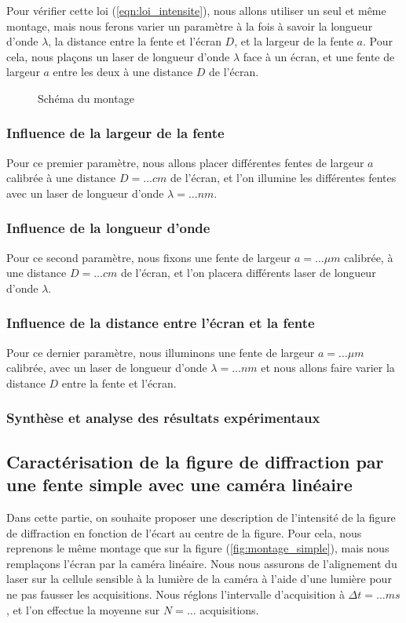 \documentclass[12pt]{article}
\begin{document}
Pour vérifier cette loi (\ref{eqn:loi_intensite}), nous allons utiliser un seul et même montage, mais nous ferons varier un paramètre à la fois à savoir la longueur d'onde $\lambda$, la distance entre la fente et l'écran $D$, 
et la largeur de la fente $a$. Pour cela, nous plaçons un laser de longueur d'onde $\lambda$ face à un écran, et une fente de largeur $a$ entre les deux à une distance $D$ de l'écran.

\begin{figure}[!h]
    \begin{center}
        \resizebox{0.7\textwidth}{5cm}{
        
        }
    \end{center}
    \caption{Schéma du montage}
\end{figure}

\subsubsection{Influence de la largeur de la fente}
Pour ce premier paramètre, nous allons placer différentes fentes de largeur $a$ calibrée à une distance $D = \dots cm$ de l'écran, et l'on illumine les différentes fentes avec un laser de longueur d'onde
$\lambda = \dots nm$. 

\subsubsection{Influence de la longueur d'onde}
Pour ce second paramètre, nous fixons une fente de largeur $a = \dots \mu m$ calibrée, à une distance $D = \dots cm$ de l'écran, et l'on placera différents laser de longueur d'onde $\lambda$.

\subsubsection{Influence de la distance entre l'écran et la fente}
Pour ce dernier paramètre, nous illuminons une fente de largeur $a = \dots \mu m$ calibrée, avec un laser de longueur d'onde $\lambda = \dots nm$ et nous allons faire varier la distance $D$ entre la fente et l'écran.

\subsubsection{Synthèse et analyse des résultats expérimentaux}

\break
\subsection{Caractérisation de la figure de diffraction par une fente simple avec une caméra linéaire}
Dans cette partie, on souhaite proposer une description de l'intensité de la figure de diffraction en fonction de l'écart au centre de la figure. Pour cela, nous reprenons le même montage
que sur la figure (\ref{fig:montage_simple}), mais nous remplaçons l'écran par la caméra linéaire. Nous nous assurons de l'alignement du laser sur la cellule sensible à la lumière de la caméra à l'aide d'une lumière pour ne pas fausser
les acquisitions. Nous réglons l'intervalle d'acquisition à $\Delta t = \dots ms$, et l'on effectue la moyenne sur $N = \dots$ acquisitions. 
\end{document}
